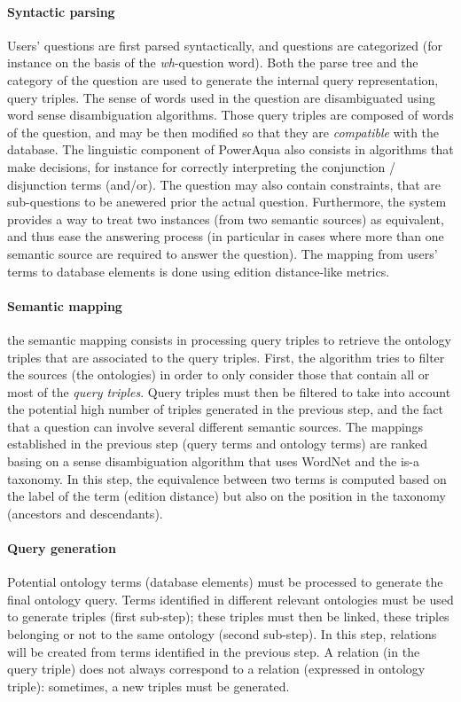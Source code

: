 \documentclass[10pt,journal,letterpaper,compsoc]{IEEEtran}
\begin{document}
\paragraph{Syntactic parsing}
Users' questions are first parsed syntactically, and questions are categorized
(for instance on the basis of the {\it wh}-question word). Both the parse tree
and the category of the question are used to generate the internal query
representation, query triples.
The sense of words used in the question are disambiguated using word sense
disambiguation algorithms. 
Those query triples are composed of words of the
question, and may be then modified so that they are {\it compatible} with the
database.
The linguistic component of {\sc PowerAqua} also consists in algorithms that
make decisions, for instance for correctly interpreting the conjunction /
disjunction terms (and/or). The question may also contain constraints, that are
sub-questions to be anewered prior the actual question. 
Furthermore, the system provides a way to treat two instances (from two
semantic sources) as equivalent, and thus ease the answering process (in
particular in cases where more than one semantic source are required to answer
the question). 
The mapping from users' terms to database elements is done using edition
distance-like metrics. 


\paragraph{Semantic mapping}
the semantic mapping consists in processing query triples to retrieve the
ontology triples that are associated to the query triples. 
First, the algorithm tries to filter the sources (the ontologies) in order to
only consider those that contain all or most of the {\it query triples}. 
Query triples must then be filtered to take into account the potential high
number of triples generated in the previous step, and the fact that a question
can involve several different semantic sources.
The mappings established in the previous step (query terms and ontology terms)
are ranked basing on a sense disambiguation algorithm that uses WordNet and the
is-a taxonomy. In this step, the equivalence between two terms is computed based
on the label of the term (edition distance) but also on the position in the
taxonomy (ancestors and descendants). 


\paragraph{Query generation}
Potential ontology terms (database elements) must be processed to generate the
final ontology query. 
Terms identified in different relevant ontologies must be used to generate
triples (first sub-step); these triples must then be linked, these triples
belonging or not to the same ontology (second sub-step). 
In this step, relations will be created from terms identified in the previous
step. A relation (in the query triple) does not always correspond to a relation
(expressed in ontology triple): sometimes, a new triples must be generated. 
\end{document}
